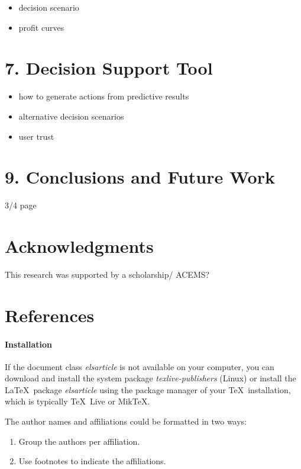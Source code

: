 \documentclass[]{elsarticle} %
\begin{document}
\begin{itemize}
\item
  decision scenario
\item
  profit curves
\end{itemize}

\section{7. Decision Support Tool}\label{decision-support-tool}

\begin{itemize}
\item
  how to generate actions from predictive results
\item
  alternative decision scenarios
\item
  user trust
\end{itemize}

\section{9. Conclusions and Future
Work}\label{conclusions-and-future-work}

3/4 page

\section{Acknowledgments}\label{acknowledgments}

This research was supported by a scholarship/ ACEMS?

\section*{References}\label{references}

\paragraph{Installation}\label{installation}

If the document class \emph{elsarticle} is not available on your
computer, you can download and install the system package
\emph{texlive-publishers} (Linux) or install the LaTeX~package
\emph{elsarticle} using the package manager of your TeX~installation,
which is typically TeX~Live or MikTeX.

The author names and affiliations could be formatted in two ways:

\begin{enumerate}
\def\labelenumi{(\arabic{enumi})}
\item
  Group the authors per affiliation.
\item
  Use footnotes to indicate the affiliations.
\end{enumerate}
\end{document}
